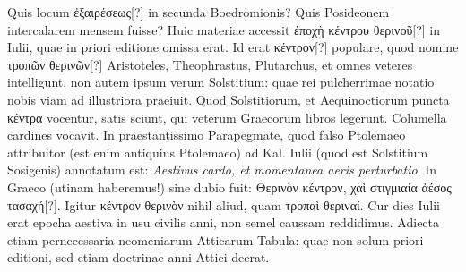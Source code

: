 Quis locum
\textgreek{ἐξαιρέσεως[?]} in secunda Boedromionis?
Quis Posideonem intercalarem
mensem fuisse?
Huic materiae accessit \textgreek{ἐποχὴ κέντρου θερινοῦ[?]}
in  Iulii, quae in priori editione omissa erat.
Id erat \textgreek{κέντρον[?]}
populare, quod nomine \textgreek{τροπῶν θερινῶν[?]}
 Aristoteles, Theophrastus,
Plutarchus, et omnes veteres intelligunt, non autem ipsum verum
Solstitium: quae rei pulcherrimae notatio nobis viam ad illustriora
praeiuit.
Quod Solstitiorum, et Aequinoctiorum puncta \textgreek{κέντρα} vocentur,
satis sciunt, qui veterum Graecorum libros legerunt.
Columella
cardines vocavit.
In praestantissimo Parapegmate, quod falso
Ptolemaeo attribuitor (est enim antiquius Ptolemaeo) ad  Kal.
Iulii (quod est Solstitium Sosigenis) annotatum est: \textit{Aestivus cardo,
et momentanea aeris perturbatio}.
In Graeco (utinam haberemus!)
sine dubio fuit: \textgreek{Θερινὸν κέντρον, χαὶ στιγμιαία ἀέσος τασαχή[?]}.
Igitur \textgreek{κέντρον
θερινὸν} nihil aliud, quam \textgreek{τροπαὶ θεριναί}.
Cur  dies Iulii erat
epocha aestiva in usu civilis anni, non semel caussam reddidimus. 
Adiecta etiam pernecessaria neomeniarum Atticarum Tabula: quae
non solum priori editioni, sed etiam doctrinae anni Attici deerat.

